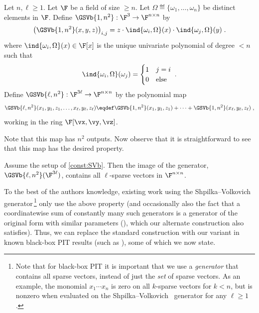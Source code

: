 \documentclass{toc}
\begin{document}
\begin{construction}\label{const:SVb}
        Let $n,\ell\ge 1$. Let $\F$ be a field of size $\ge n$. Let $\Omega\eqdef\{\omega_1,\ldots,\omega_n\}$ be distinct elements in $\F$. Define $\GSVb{1,n^2}:\F^3\to\F^{n\times n}$ by
        \[
                \left(\GSVb{1,n^2}(x,y,z)\right)_{i,j}=z\cdot \ind{\omega_i,\Omega}(x)\cdot\ind{\omega_j,\Omega}(y)
                \;.
        \]
        where $\ind{\omega_i,\Omega}(x)\in\F[x]$ is the unique univariate polynomial of degree $<n$ such that
        \[
                \ind{\omega_i,\Omega}(\omega_j)=
                \begin{cases}
                        1       &       j=i\\
                        0       &       \text{else}
                \end{cases}
                \;.
        \]
        Define $\GSVb{\ell,n^2}:\F^{3\ell}\to\F^{n\times n}$ by the polynomial map
        \[
                \GSVb{\ell,n^2}(x_1,y_1,z_1,\ldots,x_\ell,y_\ell,z_\ell)\eqdef\GSVb{1,n^2}(x_1,y_1,z_1)+\cdots+\GSVb{1,n^2}(x_\ell,y_\ell,z_\ell)
                \;,
        \]
        working in the ring $\F[\vx,\vy,\vz]$.
\end{construction}

Note that this map has $n^2$ outputs. Now observe that it is straightforward to see that this map has the desired property.

\begin{lemmawp}
        Assume the setup of \autoref{const:SVb}.  Then the image of the generator, $\GSVb{\ell,n^2}(\F^{3\ell})$, contains all $\ell$-sparse vectors in $\F^{n\times n}$.
\end{lemmawp}
%

To the best of the authors knowledge, existing
%
work   %
using the Shpilka--Volkovich~\cite{ShpilkaVolkovich09} generator\,\footnote{Note that for black-box PIT it is important that we use a \emph{generator} that contains all sparse vectors, instead of just the \emph{set} of sparse vectors. As an example, the monomial $x_1\cdots x_n$ is zero on all $k$-sparse vectors for $k<n$, but is nonzero when evaluated on the Shpilka--Volkovich~\cite{ShpilkaVolkovich09} generator for any $\ell\ge 1$.} only use the above property (and occasionally also the fact that a
%
coordinatewise  %
sum of %
constantly many  %
such generators is a generator of the original form with similar parameters (\cite{AgrawalSS13,ForbesSS14,GurjarKST15,Forbes15}), which our alternate construction also satisfies).
Thus, %
we can replace the standard construction with our variant in known black-box PIT results (such as \cite{ShpilkaVolkovich09,AgrawalSS13,ForbesShpilka13a,ForbesSS14,GurjarKST15,Forbes15}), some of which we now state.
\end{document}
